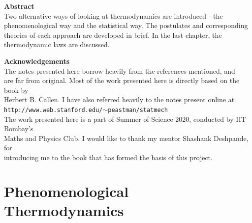\documentclass[oneside]{book}
\begin{document}
\thispagestyle{empty}
\begin{center}
\vspace*{3.5cm}
\Large
\textbf{Abstract}
\vspace{0.2cm}
\normalsize
\\Two alternative ways of looking at thermodynamics are introduced - the 
\\phenomenological way and the statistical way. The postulates and corresponding
\\theories of each approach are developed in brief. In the last chapter, the 
\\thermodynamic laws are discussed.


\vspace{2.5cm}
\Large
\textbf{Acknowledgements}
\vspace{0.2cm}
\normalsize
\\The notes presented here borrow heavily from the references mentioned, and 
\\are far from original. Most of the work presented here is directly based on the book by
\\Herbert B. Callen. I have also referred heavily to the notes present online at
\\\texttt{http://www.web.stanford.edu/$\sim$peastman/statmech}
\\The work presented here is a part of Summer of Science 2020, conducted by IIT Bombay's
\\Maths and Physics Club. I would like to thank my mentor Shashank Deshpande, for 
\\introducing me to the book that has formed the basis of this project.



\end{center}




\tableofcontents 















\chapter{Phenomenological Thermodynamics}
\end{document}
